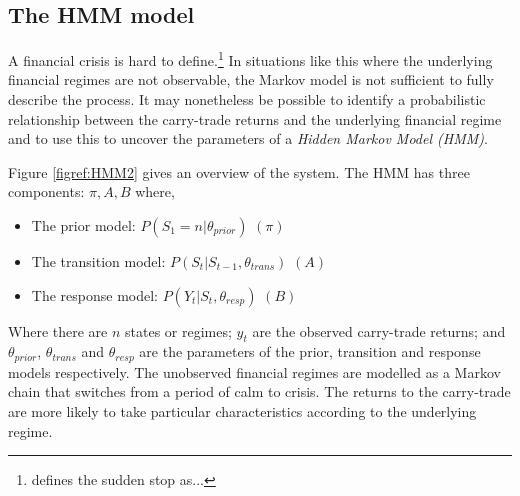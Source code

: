 \documentclass[12pt, a4paper, oneside]{article} %
\begin{document}
\subsection{The HMM model}
A financial crisis is hard to define.\footnote{\citet{CalvoSS} defines the sudden stop as...}  In situations like this where the underlying financial regimes are not observable, the Markov model is not sufficient to fully describe the process. It may nonetheless be possible to identify a probabilistic relationship between the carry-trade returns and the underlying financial regime and to use this to uncover the parameters of a \emph{Hidden Markov Model (HMM)}. 

Figure \ref{figref:HMM2} gives an overview of the system.  The HMM has three components: $\pi, A, B$ where,

\begin{itemize}
\item The prior model: $P(S_1 = n| \theta_{prior})$ $(\pi)$
\item The transition model: $P(S_t| S_{t-1}, \theta_{trans})$ $(A)$
\item The response model: $P(Y_t| S_t, \theta_{resp})$ $(B)$
\end{itemize}

Where there are $n$ states or regimes; $y_t$ are the observed carry-trade returns; and $\theta_{prior}$, $\theta_{trans}$ and  $\theta_{resp}$ are the parameters of the prior, transition and response models respectively. The unobserved financial regimes are modelled as a Markov chain that switches from a period of calm to crisis.  The returns to the carry-trade are more likely to take particular characteristics according to the underlying regime.   
\end{document}
